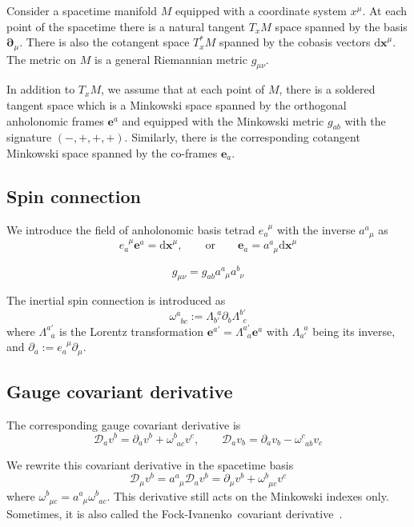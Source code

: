 \documentclass[
10pt, %
a4paper, %
oneside, %
headinclude,footinclude, %
BCOR5mm, %
]{scrartcl}
\newcommand{\xx}{\mathbf{x}}
\newcommand{\dx}{\mathrm{d}\xx}
\newcommand{\pd}{\partial}
\newcommand{\itetr}[2]{e^{\phantom{#2}#1}_{#2}}
\newcommand{\tetr}[2]{a^{#1}_{\phantom{#1}#2}}
\newcommand{\spin}[2]{\omega^{#1}_{\phantom{#1}#2}}
\newcommand{\Lor}[2]{\Lambda^{#1'}_{\phantom{#1}#2}}
\newcommand{\iLor}[2]{\Lambda^{\phantom{#2}#1}_{#2'}}
\newcommand{\D}[1]{\mathcal{D}_{#1}} %
\newcommand{\FI}{Fock-Ivanenko}
\begin{document}
Consider a spacetime manifold $ M $ equipped with a coordinate system $ x^\mu $. At each point of 
the spacetime there is a natural tangent $ T_{x}M $ space spanned by the basis $ \bm{\pd}_\mu $. 
There is also the cotangent space $ T_x^*M $ spanned by the cobasis vectors $ \bm{\dx}^\mu $.
The metric on $ M $ is a general Riemannian metric $ g_{\mu\nu} $.

In addition to $ T_{x}M $, we assume that at each point of $ M $, there is a soldered tangent space 
which is a Minkowski space spanned by the orthogonal anholonomic 
frames $ \bm{e}^a $ and equipped with the Minkowski metric $ g_{ab} $ with the signature $ 
(-,+,+,+) $. Similarly, there is the 
corresponding cotangent Minkowski space spanned by the co-frames $ \bm{e}_a $. 

\subsection{Spin connection}

We introduce the field of anholonomic basis tetrad $ \itetr{\mu}{a} $ with the inverse $ 
\tetr{a}{\mu} $ as
\begin{equation}
\itetr{\mu}{a} \bm{e}^a = \bm{\dx}^\mu, \qquad \text{or} \qquad \bm{e}_a = \tetr{a}{\mu}\bm{\dx}^\mu
\end{equation}


\begin{equation}
g_{\mu\nu} = g_{ab} \tetr{a}{\mu}\tetr{b}{\nu}
\end{equation}


The inertial spin connection is introduced as
\begin{equation}
\spin{a}{bc} := \iLor{a}{b}\pd_b\Lor{b}{c}
\end{equation}
where $ \Lor{a}{a} $ is the Lorentz transformation $ \bm{e}^{a'} = \Lor{a}{a} \bm{e}^a $ with $ 
\iLor{a}{a} $ being its inverse, and $ \pd_a := \itetr{\mu}{a} \pd_\mu $.

\subsection{Gauge covariant derivative}

The corresponding gauge covariant derivative is 
\begin{equation}
\D{a} v^b = \pd_a v^b + \spin{b}{ac} v^c, \qquad \D{a} v_b = \pd_a v_b - \spin{c}{ab} v_c
\end{equation}

We rewrite this covariant derivative in the spacetime basis
\begin{equation}
\D{\mu} v^b = \tetr{a}{\mu} \D{a} v^b = \pd_\mu v^b + \spin{b}{\mu c} v^c
\end{equation}
where $ \spin{b}{\mu c} = \tetr{a}{\mu}\spin{b}{ac} $.
This derivative still acts on the Minkowski indexes only. Sometimes, it is also called the \FI\ 
covariant derivative~\cite{AldrovandiPereiraBook}.
\end{document}
